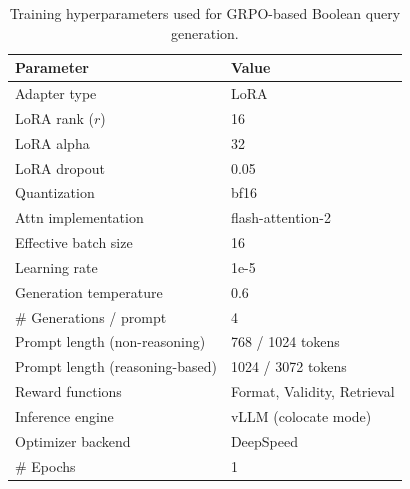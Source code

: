 \begin{table}[h]
	\centering
	\small
		\caption{Training hyperparameters used for GRPO-based Boolean query generation.}
	\begin{tabular}{ll}
		\toprule
		\textbf{Parameter} & \textbf{Value} \\
		\midrule
		Adapter type            & LoRA \\
		LoRA rank ($r$)         & 16 \\
		LoRA alpha              & 32 \\
		LoRA dropout            & 0.05 \\
		Quantization            & bf16 \\
		Attn implementation     & flash-attention-2 \\
		Effective batch size    & 16 \\
		Learning rate           & 1e-5 \\
		Generation temperature  & 0.6 \\
		\# Generations / prompt & 4 \\
		Prompt length (non-reasoning)   & 768 / 1024 tokens \\
		Prompt length (reasoning-based) & 1024 / 3072 tokens \\
		Reward functions        & Format, Validity, Retrieval \\
		Inference engine        & vLLM (colocate mode) \\
		Optimizer backend       & DeepSpeed \\
		\# Epochs               & 1 \\
		\bottomrule
	\end{tabular}


	\label{appendix:tab-training-details}
\end{table}